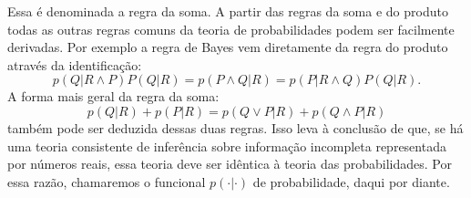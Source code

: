 Essa é denominada a regra da soma. A partir das regras da soma e do produto todas as outras regras comuns da teoria de probabilidades podem ser facilmente derivadas. Por exemplo a regra de Bayes vem diretamente da regra do produto através da identificação:
\begin{equation}
 p(Q| R\wedge P) P(Q | R) = p(P\wedge Q | R) = p(P| R\wedge Q) P(Q | R).
\end{equation}
A forma mais geral da regra da soma:
\begin{equation}
p(Q|R) + p(P|R) = p(Q\vee P | R) +  p(Q\wedge P | R) 
\end{equation}
também pode ser deduzida dessas duas regras. Isso leva à conclusão de que, se há uma teoria consistente de inferência sobre informação incompleta representada por números reais, essa teoria deve ser idêntica à teoria das probabilidades. Por essa razão, chamaremos o funcional $p(\cdot|\cdot)$ de probabilidade, daqui por diante.
